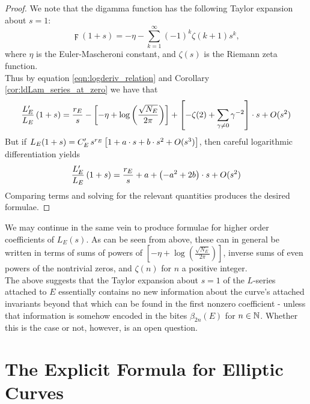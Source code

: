 \begin{proof}
We note that the digamma function has the following Taylor expansion about $s=1$:
\begin{equation}
\digamma(1+s) = -\eta - \sum_{k=1}^{\infty} (-1)^k \zeta(k+1) s^k,
\end{equation}
where $\eta$ is the Euler-Mascheroni constant, and $\zeta(s)$ is the Riemann zeta function. \\
Thus by equation \ref{eqn:logderiv_relation} and Corollary \ref{cor:ldLam_series_at_zero} we have that
\begin{equation*}
\frac{L_E^{\prime}}{L_E}\left(1+s\right) = \frac{r_E}{s} - \left[-\eta + \log\left(\frac{\sqrt{N_E}}{2\pi}\right)\right] + \left[-\zeta(2) + \sum_{\gamma\ne0} \gamma^{-2}\right]\cdot s + O(s^2)
\end{equation*}
But if $L_E(1+s) = C_E^{\prime} \, s^{r_E}\left[1 + a\cdot s + b\cdot s^2 + O(s^3)\right]$, then careful logarithmic differentiation yields
\begin{equation*}
\frac{L_E^{\prime}}{L_E}\left(1+s\right) = \frac{r_E}{s} + a + \left(-a^2 + 2b\right)\cdot s + O(s^2)
\end{equation*}
Comparing terms and solving for the relevant quantities produces the desired formulae.
\end{proof}
We may continue in the same vein to produce formulae for higher order coefficients of $L_E(s)$. As can be seen from above, these can in general be written in terms of sums of powers of $\left[-\eta + \log\left(\frac{\sqrt{N_E}}{2\pi}\right)\right]$, inverse sums of even powers of the nontrivial zeros, and $\zeta(n)$ for $n$ a positive integer. \\

The above suggests that the Taylor expansion about $s=1$ of the $L$-series attached to $E$ essentially contains no new information about the curve's attached invariants beyond that which can be found in the first nonzero coefficient - unless that information is somehow encoded in the bites $\beta_{2n}(E)$ for $n \in \mathbb{N}$. Whether this is the case or not, however, is an open question.


\newpage
\section{The Explicit Formula for Elliptic Curves}

